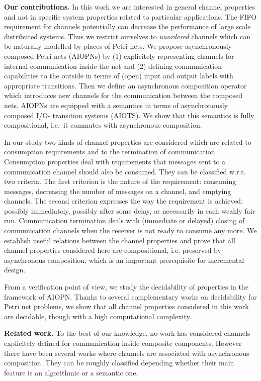 \noindent
{\bf Our contributions.}
In this work we are interested in general channel properties and not in specific
system properties related to particular applications.
The FIFO requirement for channels
potentially can decrease the performance
of large scale distributed systems. Thus we restrict ourselves to
\emph{unordered} channels which can be naturally modelled
by places of Petri nets. We propose asynchronously composed Petri nets (AIOPNs)
by (1) explicitely representing channels for internal communication inside the net and (2) defining
communication capabilities to the outside in terms of (open) input and output labels
with appropriate transitions. 
Then we define an asynchronous composition operator which introduces
new channels for the communication between the composed nets.
AIOPNs are equipped with a semantics in terms of
asynchronously composed I/O- transition systems (AIOTS).
We show that  this semantics is fully compositional, i.e.\  it commutes with asynchronous composition.

In our study two kinds of channel properties are considered which are related to
consumption requirements and to the termination of communication. Consumption
properties deal with requirements that messages sent to a communication channel
should also be consumed. They can be classified w.r.t.
two criteria. The first criterion is the nature of the
requirement: consuming messages, decreasing the number of messages on a channel,
and emptying channels. The second criterion expresses the way the requirement
is achieved: possibly immediately, possibly after some delay, or necessarily in each weakly fair run.
Communication termination deals with (immediate or delayed) closing of communication channels
when the receiver is not ready to consume any more.
We establish useful relations between the channel properties and prove
that all channel properties considered here are compositional, i.e. preserved
by asynchronous composition, which is an important prerequisite for incremental design.

From a verification point of view, we study the decidability
of properties in the framework of AIOPN. Thanks to several complementary
works on decidability for Petri net problems, we show that all
channel properties considered in this work are decidable, though with a high
computational complexity.

\noindent
{\bf Related work.} To the best of our knowledge, no work has considered
channels explicitely defined for communication inside composite components. However there have been several works 
where channels are associated with asynchronous composition. They can be
roughly classified depending whether their main feature is an 
algorithmic or a semantic one.

